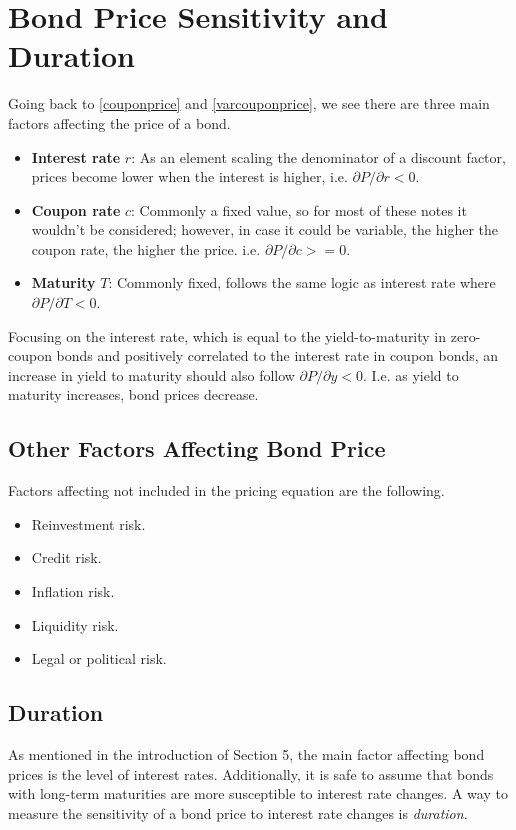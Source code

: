 \documentclass[10pt,letterpaper]{article}
\begin{document}
\section{Bond Price Sensitivity and Duration}
Going back to \eqref{couponprice} and \eqref{varcouponprice}, we see there are three main factors affecting the price of a bond.
\begin{itemize}
\item \textbf{Interest rate} $r$: As an element scaling the denominator of a discount factor, prices become lower when the interest is higher, i.e. $\partial P / \partial r < 0$.
\item \textbf{Coupon rate} $c$: Commonly a fixed value, so for most of these notes it wouldn't be considered; however, in case it could be variable, the higher the coupon rate, the higher the price. i.e. $\partial P/ \partial c >=0$.
\item \textbf{Maturity} $T$: Commonly fixed, follows the same logic as interest rate where $\partial P / \partial T < 0$.
\end{itemize}

Focusing on the interest rate, which is equal to the yield-to-maturity in zero-coupon bonds and positively correlated to the interest rate in coupon bonds, an increase in yield to maturity should also follow $\partial P/\partial y < 0$. I.e. as yield to maturity increases, bond prices decrease.

\subsection{Other Factors Affecting Bond Price}
Factors affecting not included in the pricing equation are the following.
\begin{itemize}
\item Reinvestment risk.
\item Credit risk.
\item Inflation risk.
\item Liquidity risk.
\item Legal or political risk.
\end{itemize}

\subsection{Duration}
As mentioned in the introduction of Section 5, the main factor affecting bond prices is the level of interest rates. Additionally, it is safe to assume that bonds with long-term maturities are more susceptible to interest rate changes. A way to measure the sensitivity of a bond price to interest rate changes is \emph{duration}.
\end{document}
